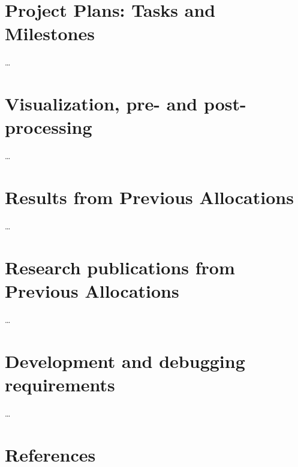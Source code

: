 \documentclass[11pt]{article}
\begin{document}
\section{Project Plans: Tasks and Milestones}
\ldots

\section{Visualization, pre- and post-processing}
\ldots

\section{Results from Previous Allocations}
\ldots

\section{Research publications from Previous Allocations}
\ldots

\section{Development and debugging requirements}
\ldots 

\section*{References}


\end{document}

